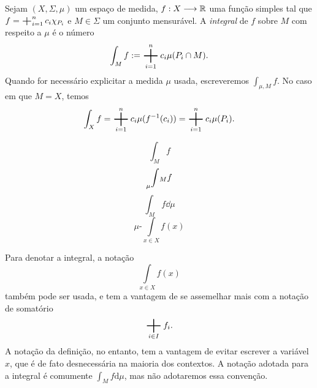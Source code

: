 \begin{defi}
Sejam $(X,\Sigma,\mu)$ um espaço de medida, $f : X \longrightarrow \mathbb{R}$ uma função simples tal que $f=\bigplus_{i=1}^n c_i \idc_{P_i}$ e $M \in \Sigma$ um conjunto mensurável. A \emph{integral} de $f$ sobre $M$ com respeito a $\mu$ é o número
	\begin{equation*}
	\int_M f := \bigplus_{i=1}^n c_i \mu(P_i \cap M).
	\end{equation*}
Quando for necessário explicitar a medida $\mu$ usada, escreveremos $\displaystyle\int_{\mu,M} f$. No caso em que $M=X$, temos
	\begin{equation*}
	\int_X f = \bigplus_{i=1}^n c_i \mu(f\inv(c_i)) =  \bigplus_{i=1}^n c_i \mu(P_i).
	\end{equation*}
\end{defi}

\newpage

\begin{equation*}
\int_M f
\end{equation*}
\begin{equation*}
\prescript{}{\mu}\int_M f
\end{equation*}
\begin{equation*}
\int_M f \dd \mu
\end{equation*}
\begin{equation*}
\mu\text{-}\int\limits_{x \in X} f(x)
\end{equation*}




Para denotar a integral, a notação
	\begin{equation*}
	\int\limits_{x \in X} f(x)
	\end{equation*}
também pode ser usada, e tem a vantagem de se assemelhar mais com a notação de somatório
	\begin{equation*}
	\bigplus_{i \in I} f_i.
	\end{equation*}
A notação da definição, no entanto, tem a vantagem de evitar escrever a variável $x$, que é de fato desnecessária na maioria dos contextos. A notação adotada para a integral é comumente $\int_M f \mathrm{d}\mu$, mas não adotaremos essa convenção.

